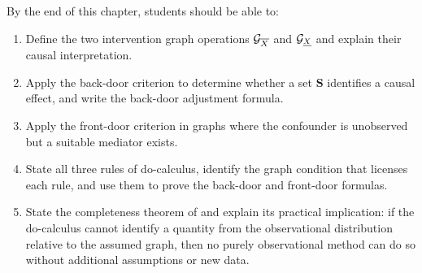 \documentclass[master.tex]{subfiles}
\begin{document}
\begin{tcolorbox}[defstyle, title={Learning Objectives}]
By the end of this chapter, students should be able to:
\begin{enumerate}
  \item Define the two intervention graph operations $\mathcal{G}_{\overline{X}}$ and
        $\mathcal{G}_{\underline{X}}$ and explain their causal interpretation.
  \item Apply the back-door criterion to determine whether a set $\mathbf{S}$
        identifies a causal effect, and write the back-door adjustment formula.
  \item Apply the front-door criterion in graphs where the confounder is
        unobserved but a suitable mediator exists.
  \item State all three rules of do-calculus, identify the graph condition
        that licenses each rule, and use them to prove the back-door and
        front-door formulas.
  \item State the completeness theorem of \citet{shpitser2006identification} and explain
        its practical implication: if the do-calculus cannot identify a quantity
        from the observational distribution relative to the assumed graph, then
        no purely observational method can do so without additional assumptions
        or new data.
\end{enumerate}
\end{tcolorbox}
\end{document}
